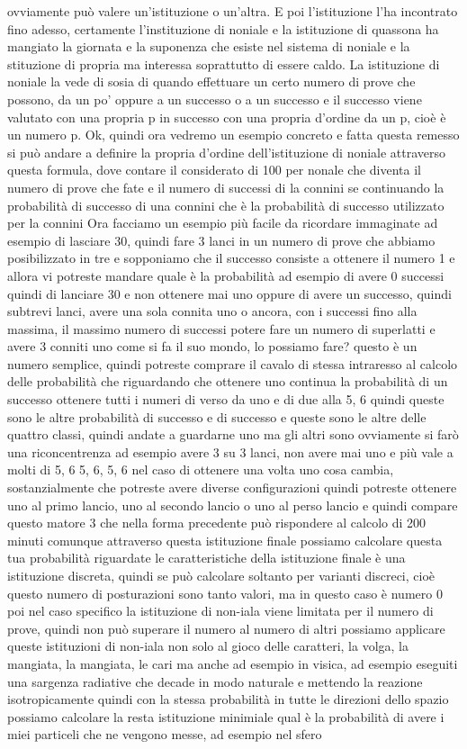 {ovviamente può valere un'istituzione o un'altra. E poi l'istituzione l'ha incontrato fino adesso, certamente l'instituzione di noniale e la istituzione di quassona ha mangiato la giornata e la suponenza che esiste nel sistema di noniale e la stituzione di propria ma interessa soprattutto di essere caldo. La istituzione di noniale la vede di sosia di quando effettuare un certo numero di prove che possono, da un po' oppure a un successo o a un successo e il successo viene valutato con una propria p in successo con una propria d'ordine da un p, cioè è un numero p. Ok, quindi ora vedremo un esempio concreto e fatta questa remesso si può andare a definire la propria d'ordine dell'istituzione di noniale attraverso questa formula, dove contare il considerato di 100 per nonale che diventa il numero di prove che fate e il numero di successi di la connini se continuando la probabilità di successo di una connini che è la probabilità di successo utilizzato per la connini Ora facciamo un esempio più facile da ricordare immaginate ad esempio di lasciare 30, quindi fare 3 lanci in un numero di prove che abbiamo posibilizzato in tre e sopponiamo che il successo consiste a ottenere il numero 1 e allora vi potreste mandare quale è la probabilità ad esempio di avere 0 successi quindi di lanciare 30 e non ottenere mai uno oppure di avere un successo, quindi subtrevi lanci, avere una sola connita uno o ancora, con i successi fino alla massima, il massimo numero di successi potere fare un numero di superlatti e avere 3 conniti uno come si fa il suo mondo, lo possiamo fare? questo è un numero semplice, quindi potreste comprare il cavalo di stessa intraresso al calcolo delle probabilità che riguardando che ottenere uno continua la probabilità di un successo ottenere tutti i numeri di verso da uno e di due alla 5, 6 quindi queste sono le altre probabilità di successo e di successo e queste sono le altre delle quattro classi, quindi andate a guardarne uno ma gli altri sono ovviamente si farò una riconcentrenza ad esempio avere 3 su 3 lanci, non avere mai uno e più vale a molti di 5, 6 5, 6, 5, 6 nel caso di ottenere una volta uno cosa cambia, sostanzialmente che potreste avere diverse configurazioni quindi potreste ottenere uno al primo lancio, uno al secondo lancio o uno al perso lancio e quindi compare questo matore 3 che nella forma precedente può rispondere al calcolo di 200 minuti comunque attraverso questa istituzione finale possiamo calcolare questa tua probabilità riguardate le caratteristiche della istituzione finale è una istituzione discreta, quindi se può calcolare soltanto per varianti discreci, cioè questo numero di posturazioni sono tanto valori, ma in questo caso è numero 0 poi nel caso specifico la istituzione di non-iala viene limitata per il numero di prove, quindi non può superare il numero al numero di altri possiamo applicare queste istituzioni di non-iala non solo al gioco delle caratteri, la volga, la mangiata, la mangiata, le cari ma anche ad esempio in visica, ad esempio eseguiti una sargenza radiative che decade in modo naturale e mettendo la reazione isotropicamente quindi con la stessa probabilità in tutte le direzioni dello spazio possiamo calcolare la resta istituzione minimiale qual è la probabilità di avere i miei particeli che ne vengono messe, ad esempio nel sfero }
